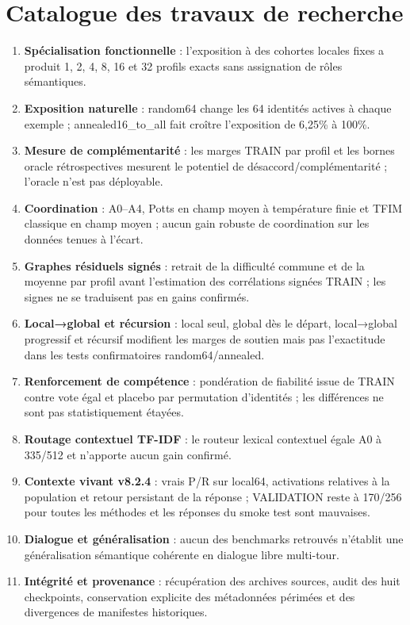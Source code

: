 \documentclass[11pt,a4paper]{report}
\begin{document}
\section{Catalogue des travaux de recherche}
\begin{enumerate}
\item \textbf{Spécialisation fonctionnelle} : l’exposition à des cohortes locales fixes a produit 1, 2, 4, 8, 16 et 32 profils exacts sans assignation de rôles sémantiques.
\item \textbf{Exposition naturelle} : random64 change les 64 identités actives à chaque exemple ; annealed16\_to\_all fait croître l’exposition de 6,25\% à 100\%.
\item \textbf{Mesure de complémentarité} : les marges TRAIN par profil et les bornes oracle rétrospectives mesurent le potentiel de désaccord/complémentarité ; l’oracle n’est pas déployable.
\item \textbf{Coordination} : A0--A4, Potts en champ moyen à température finie et TFIM classique en champ moyen ; aucun gain robuste de coordination sur les données tenues à l’écart.
\item \textbf{Graphes résiduels signés} : retrait de la difficulté commune et de la moyenne par profil avant l’estimation des corrélations signées TRAIN ; les signes ne se traduisent pas en gains confirmés.
\item \textbf{Local→global et récursion} : local seul, global dès le départ, local→global progressif et récursif modifient les marges de soutien mais pas l’exactitude dans les tests confirmatoires random64/annealed.
\item \textbf{Renforcement de compétence} : pondération de fiabilité issue de TRAIN contre vote égal et placebo par permutation d’identités ; les différences ne sont pas statistiquement étayées.
\item \textbf{Routage contextuel TF-IDF} : le routeur lexical contextuel égale A0 à 335/512 et n’apporte aucun gain confirmé.
\item \textbf{Contexte vivant v8.2.4} : vrais P/R sur local64, activations relatives à la population et retour persistant de la réponse ; VALIDATION reste à 170/256 pour toutes les méthodes et les réponses du smoke test sont mauvaises.
\item \textbf{Dialogue et généralisation} : aucun des benchmarks retrouvés n’établit une généralisation sémantique cohérente en dialogue libre multi-tour.
\item \textbf{Intégrité et provenance} : récupération des archives sources, audit des huit checkpoints, conservation explicite des métadonnées périmées et des divergences de manifestes historiques.
\end{enumerate}
\end{document}
